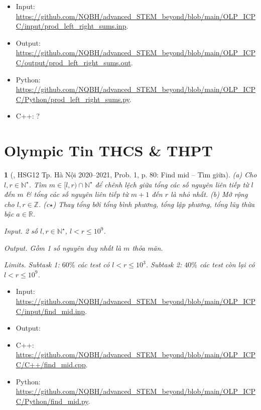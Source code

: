 \documentclass{article}
\newtheorem{baitoan}{}
\begin{document}
\begin{itemize}
	\item Input: \url{https://github.com/NQBH/advanced_STEM_beyond/blob/main/OLP_ICPC/input/prod_left_right_sums.inp}.
	\item Output: \url{https://github.com/NQBH/advanced_STEM_beyond/blob/main/OLP_ICPC/output/prod_left_right_sums.out}.
	\item Python: \url{https://github.com/NQBH/advanced_STEM_beyond/blob/main/OLP_ICPC/Python/prod_left_right_sums.py}.
	\item C++: ?
\end{itemize}


\section{Olympic Tin THCS \& THPT}

\begin{baitoan}[\cite{Trung_HSG_THPT_Tin}, HSG12 Tp. Hà Nội 2020--2021, Prob. 1, p. 80: Find mid -- Tìm giữa]
	(a) Cho $l,r\in\mathbb{N}^\star$. Tìm $m\in[l,r)\cap\mathbb{N}^\star$ để chênh lệch giữa tổng các số nguyên liên tiếp từ $l$ đến $m$ \& tổng các số nguyên liên tiếp từ $m + 1$ đến $r$ là nhỏ nhất. (b) Mở rộng cho $l,r\in\mathbb{Z}$. (c$\star$) Thay tổng bởi tổng bình phương, tổng lập phương, tổng lũy thừa bậc $a\in\mathbb{R}$.
	\item {\sf Input.} 2 số $l,r\in\mathbb{N}^\star$, $l < r\le10^9$.
	\item {\sf Output.} Gồm 1 số nguyên duy nhất là $m$ thỏa mãn.
	\item {\sf Limits.} Subtask 1: $60\%$ các test có $l < r\le10^3$. Subtask 2: $40\%$ các test còn lại có $l < r\le10^9$.
\end{baitoan}

\begin{itemize}
	\item Input: \url{https://github.com/NQBH/advanced_STEM_beyond/blob/main/OLP_ICPC/input/find_mid.inp}.
	\item Output: 
	\item C++: \url{https://github.com/NQBH/advanced_STEM_beyond/blob/main/OLP_ICPC/C++/find_mid.cpp}.
	\item Python: \url{https://github.com/NQBH/advanced_STEM_beyond/blob/main/OLP_ICPC/Python/find_mid.py}.
\end{itemize}
\end{document}
